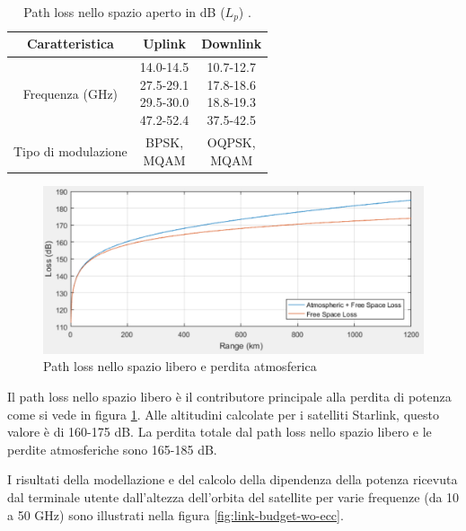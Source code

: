 \begin{table}[h]
\centering
\begin{tabular}{|c|c|c|}
\hline
\textbf{Caratteristica} & \textbf{Uplink} & \textbf{Downlink} \\ \hline
Frequenza (GHz)  & \makecell{14.0-14.5 \\ 27.5-29.1 \\ 29.5-30.0 \\ 47.2-52.4}  & \makecell{10.7-12.7\\17.8-18.6\\18.8-19.3\\37.5-42.5} \\ \hline
Tipo di modulazione  & \makecell{\acs{BPSK},\\M\acs{QAM}} & \makecell{\acs{OQPSK},\\ M\acs{QAM}} \\ \hline
\end{tabular}
\caption{Path loss nello spazio aperto in dB ($L_p$) \cite{rozenvasser_estimation_2023}.}
\label{tab:starlink-frequency-allocation-modulation-type}
\end{table}


\begin{figure}[htbp]
  \centering
  \includegraphics[width=0.8\linewidth]{./res/img/free_space_path_loss_atm_loss.png}
  \caption{Path loss nello spazio libero e perdita atmosferica}
  \label{fig:free-space-path-loss-atm-loss}
\end{figure}

Il path loss nello spazio libero è il contributore principale alla perdita di potenza come si vede in figura \ref{fig:free-space-path-loss-atm-loss}.
Alle altitudini calcolate per i satelliti Starlink, questo valore è di 160-175 dB.
La perdita totale dal path loss nello spazio libero e le perdite atmosferiche sono 165-185 dB.

I risultati della modellazione e del calcolo della dipendenza della potenza ricevuta dal terminale utente dall'altezza dell'orbita del satellite per varie frequenze (da 10 a 50 GHz) sono illustrati nella figura \ref{fig:link-budget-wo-ecc}.


